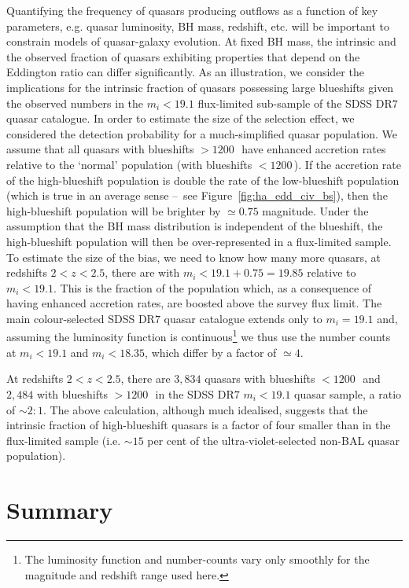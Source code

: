 Quantifying the frequency of quasars producing outflows as a function of key parameters, e.g. quasar luminosity, BH mass, redshift, etc. will be important to constrain models of quasar-galaxy evolution.  
At fixed BH mass, the intrinsic and the observed fraction of quasars exhibiting properties that depend on the Eddington ratio can differ significantly. 
As an illustration, we consider the implications for the intrinsic fraction of quasars possessing large  blueshifts given the observed numbers in the $m_i<19.1$ flux-limited sub-sample of the SDSS DR$7$ quasar catalogue. 
In order to estimate the size of the selection effect, we considered the detection probability for a much-simplified quasar population. 
We assume that all quasars with  blueshifts $>1200$\,\kms\, have enhanced accretion rates relative to the `normal' population (with  blueshifts $<1200$\,\kms). 
If the accretion rate of the high-blueshift population is double the rate of the low-blueshift population (which is true in an average sense \---\ see Figure~\ref{fig:ha_edd_civ_bs}), then the high-blueshift population will be brighter by $\simeq0.75$ magnitude.
Under the assumption that the BH mass distribution is independent of the  blueshift, the high-blueshift population will then be over-represented in a flux-limited sample.
To estimate the size of the bias, we need to know how many more quasars, at redshifts $2 < z < 2.5$, there are with $m_i<19.1+0.75=19.85$ relative to $m_i < 19.1$.
This is the fraction of the population which, as a consequence of having enhanced accretion rates, are boosted above the survey flux limit.    
The main colour-selected SDSS DR$7$ quasar catalogue extends only to $m_i= 19.1$ and, assuming the luminosity function is continuous\footnote{The luminosity function and number-counts vary only smoothly \citep[e.g.][]{ross13} for the magnitude and redshift range used here.} we thus use the number counts at $m_i < 19.1$ and $m_i < 18.35$, which differ by a factor of $\simeq 4$. 

At redshifts $2 < z <2.5$, there are $3,834$ quasars with  blueshifts $<1200$\,\kms\, and $2,484$ with blueshifts $>1200$\,\kms\, in the SDSS DR$7$ $m_i < 19.1$ quasar sample, a ratio of $\sim2:1$. 
The above calculation, although much idealised, suggests that the intrinsic fraction of high-blueshift quasars is a factor of four smaller than in the flux-limited sample (i.e. $\sim15$ per cent of the ultra-violet-selected non-BAL quasar population). 

\section{Summary}
\label{sec:conclusions}

